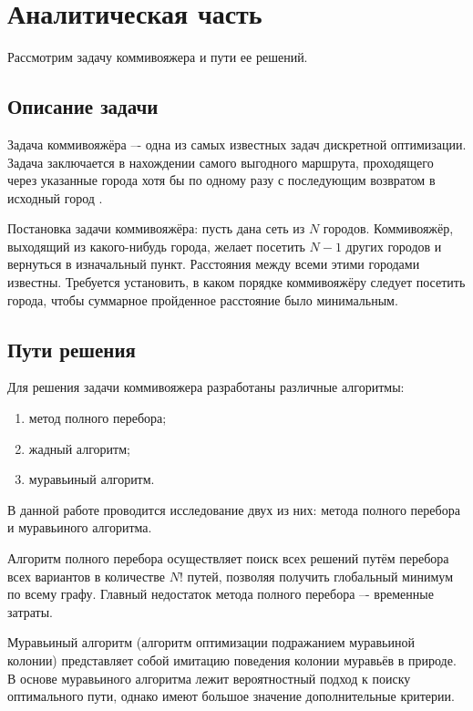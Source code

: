 \newpage
\section{Аналитическая часть}

Рассмотрим задачу коммивояжера и пути ее решений.

\subsection{Описание задачи}

Задача коммивояжёра –- одна из самых известных задач дискретной оптимизации. Задача заключается в нахождении
самого выгодного маршрута, проходящего через указанные города хотя бы по одному разу с последующим возвратом
в исходный город \cite{Levitin}.

Постановка задачи коммивояжёра: пусть дана сеть из $N$ городов. Коммивояжёр, выходящий из какого-нибудь города,
желает посетить $N-1$ других городов и вернуться в изначальный пункт. Расстояния между всеми этими городами
известны. Требуется установить, в каком порядке коммивояжёру следует посетить города, чтобы суммарное пройденное
расстояние было минимальным.

\subsection{Пути решения}

Для решения задачи коммивояжера разработаны различные алгоритмы:

\begin{enumerate}
    \item метод полного перебора;
    \item жадный алгоритм;
    \item муравьиный алгоритм.
\end{enumerate}

В данной работе проводится исследование двух из них: метода полного перебора и муравьиного алгоритма.

Алгоритм полного перебора осуществляет поиск всех решений путём перебора всех вариантов в количестве $N!$
путей, позволяя получить глобальный минимум по всему графу. Главный недостаток метода полного перебора –- временные затраты.

Муравьиный алгоритм (алгоритм оптимизации подражанием муравьиной колонии) представляет собой имитацию поведения колонии
муравьёв в природе. В основе муравьиного алгоритма лежит вероятностный подход к поиску оптимального пути, однако имеют
большое значение дополнительные критерии.


